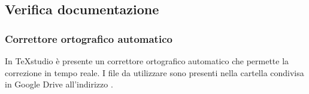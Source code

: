 	\subsection{Verifica documentazione}
		\subsubsection{Correttore ortografico automatico}
		In TeXstudio è presente un correttore ortografico automatico che permette la correzione in tempo reale. I file da utilizzare sono presenti nella cartella condivisa in Google Drive all'indirizzo .